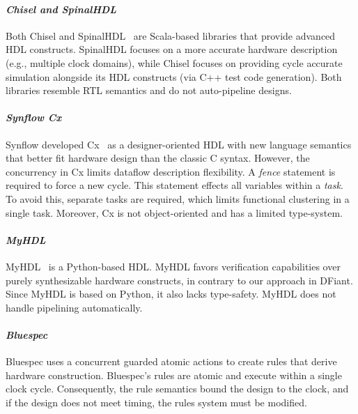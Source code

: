 \paragraph*{\bf \em Chisel and SpinalHDL} 
Both Chisel and SpinalHDL~\cite{Charles2016} are Scala-based libraries that provide advanced HDL constructs. SpinalHDL focuses on a more accurate hardware description (e.g., multiple clock domains), while Chisel focuses on providing cycle accurate simulation alongside its HDL constructs (via C++ test code generation). Both libraries resemble RTL semantics and do not auto-pipeline designs. 

\paragraph*{\bf \em Synflow Cx} 
Synflow developed Cx~\cite{CxLang2014} as a designer-oriented HDL with new language semantics that better fit hardware design than the classic C syntax.
However, the concurrency in Cx limits dataflow description flexibility. A \textit{fence} statement is required to force a new cycle. This statement effects all variables within a \textit{task}. To avoid this, separate tasks are required, which limits functional clustering in a single task.
Moreover, Cx is not object-oriented and has a limited type-system.

\paragraph*{\bf \em MyHDL}
MyHDL~\cite{decaluwe2004myhdl} is a Python-based HDL. MyHDL favors verification capabilities over purely synthesizable hardware constructs, in contrary to our approach in DFiant. Since MyHDL is based on Python, it also lacks type-safety. MyHDL does not handle pipelining automatically.

\paragraph*{\bf \em Bluespec} 
Bluespec uses a concurrent guarded atomic actions to create rules that derive hardware construction. Bluespec's rules are atomic and execute within a single clock cycle. Consequently, the rule semantics bound the design to the clock, and if the design does not meet timing, the rules system must be modified. 

